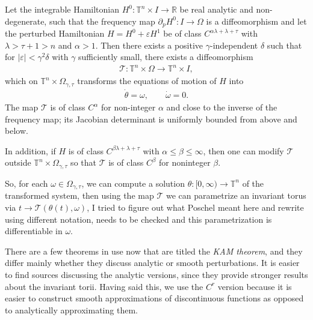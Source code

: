 \begin{theorem}
Let the integrable Hamiltonian $H^0:\mathbb T^n\times I\to\mathbb R$ be real analytic and non-degenerate, such that the frequency map $\partial_p H^0:I\to\Omega$ is a diffeomorphism and let the perturbed Hamiltonian $H=H^0+\varepsilon H^1$ be of class $C^{\alpha\lambda+\lambda+\tau}$ with $\lambda>\tau+1>n$ and $\alpha>1$. Then there exists a positive $\gamma$-independent $\delta$ such that for $|\varepsilon|<\gamma^2\delta$ with $\gamma$ sufficiently small, there exists a diffeomorphism
\begin{align*}
\mathcal T: \mathbb T^n\times\Omega \to\mathbb T^n\times I,
\end{align*} 
which on $\mathbb T^n\times\Omega_{\gamma,\tau}$ transforms the equations of motion of $H$ into
\begin{align*}
\dot \theta=\omega,\qquad \dot\omega=0.
\end{align*}
The map $\mathcal T$ is of class $C^\alpha$ for non-integer $\alpha$ and close to the inverse of the frequency map; its Jacobian determinant is uniformly bounded from above and below.

In addition, if $H$ is of class $C^{\beta\lambda+\lambda+\tau}$ with $\alpha\le\beta\le\infty$, then one can modify $\mathcal T$ outside $\mathbb T^n\times\Omega_{\gamma,\tau}$ so that $\mathcal T$ is of class $C^\beta$ for noninteger $\beta$.
\end{theorem}

So, for each $\omega\in\Omega_{\gamma,\tau}$, we can compute a solution $\theta:[0,\infty)\to\mathbb T^n$ of the transformed system, then using the map $\mathcal T$ we can parametrize an invariant torus via $t\to \mathcal T(\theta(t),\omega)$, \color{red} I tried to figure out what Poschel meant here and rewrite using different notation, needs to be checked \color{black} and this parametrization is differentiable in $\omega$.

There are a few theorems in use now that are titled the \textit{KAM theorem}, and they differ mainly whether they discuss analytic or smooth perturbations. It is easier to find sources discussing the analytic versions, since they provide stronger results about the invariant torii. Having said this, we use the $C^r$ version because it is easier to construct smooth approximations of discontinuous functions as opposed to analytically approximating them.